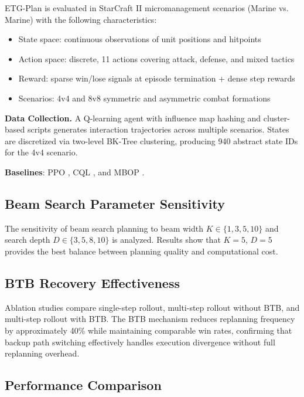 \documentclass[letterpaper]{article}
\begin{document}
ETG-Plan is evaluated in StarCraft II micromanagement scenarios (Marine vs. Marine) with the following characteristics:

\begin{itemize}
	\item State space: continuous observations of unit positions and hitpoints
	\item Action space: discrete, 11 actions covering attack, defense, and mixed tactics
	\item Reward: sparse win/lose signals at episode termination + dense step rewards
	\item Scenarios: 4v4 and 8v8 symmetric and asymmetric combat formations
\end{itemize}

\textbf{Data Collection.} A Q-learning agent \citep{watkins1989qlearning} with influence map hashing and cluster-based scripts generates interaction trajectories across multiple scenarios. States are discretized via two-level BK-Tree clustering, producing 940 abstract state IDs for the 4v4 scenario.

\textbf{Baselines}: PPO \citep{schulman2017ppo}, CQL \citep{kumar2020cql}, and MBOP \citep{argenson2021mbop}.

\subsection{Beam Search Parameter Sensitivity}

The sensitivity of beam search planning to beam width $K \in \{1, 3, 5, 10\}$ and search depth $D \in \{3, 5, 8, 10\}$ is analyzed. Results show that $K=5$, $D=5$ provides the best balance between planning quality and computational cost.

\subsection{BTB Recovery Effectiveness}

Ablation studies compare single-step rollout, multi-step rollout without BTB, and multi-step rollout with BTB. The BTB mechanism reduces replanning frequency by approximately 40\% while maintaining comparable win rates, confirming that backup path switching effectively handles execution divergence without full replanning overhead.

\subsection{Performance Comparison}
\end{document}
